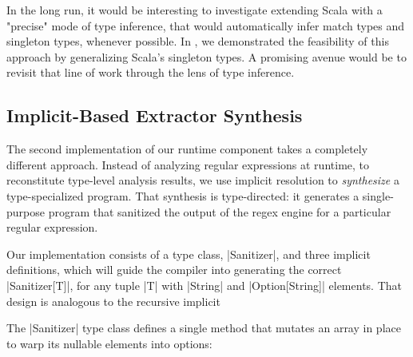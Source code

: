 In the long run, it would be interesting to investigate extending Scala with a "precise" mode of type inference, that would automatically infer match types and singleton types, whenever possible.
In , we demonstrated the feasibility of this approach by generalizing Scala's singleton types.
A promising avenue would be to revisit that line of work through the lens of type inference.

\subsection{Implicit-Based Extractor Synthesis}
\label{subsec:implicit-based-extractor-synthesis}

The second implementation of our runtime component takes a completely different approach.
Instead of analyzing regular expressions at runtime, to reconstitute type-level analysis results, we use implicit resolution to \emph{synthesize} a type-specialized program.
That synthesis is type-directed: it generates a single-purpose program that sanitized the output of the regex engine for a particular regular expression.

Our implementation consists of a type class, |Sanitizer|, and three implicit definitions, which will guide the compiler into generating the correct |Sanitizer[T]|, for any tuple |T| with |String| and |Option[String]| elements.
That design is analogous to the recursive implicit

The |Sanitizer| type class defines a single method that mutates an array in place to warp its nullable elements into options:

\regexSanitizerTypeClass
%
%
%

